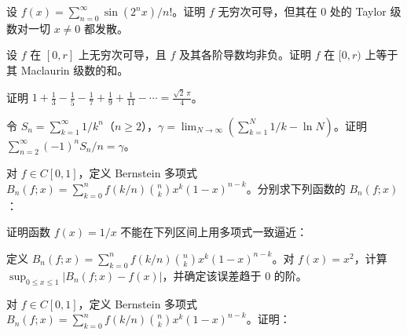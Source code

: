 \newpage
\noindent\begin{minipage}{\textwidth}
设 $f(x)=\sum_{n=0}^{\infty}\sin(2^nx)/n!$。证明 $f$ 无穷次可导，但其在 $0$ 处的 Taylor 级数对一切 $x\ne0$ 都发散。
\end{minipage}\par\vfill
\noindent\begin{minipage}{\textwidth}
设 $f$ 在 $[0,r]$ 上无穷次可导，且 $f$ 及其各阶导数均非负。证明 $f$ 在 $[0,r)$ 上等于其 Maclaurin 级数的和。
\end{minipage}\par\vfill
\noindent\begin{minipage}{\textwidth}
证明 $\displaystyle1+\frac13-\frac15-\frac17+\frac19+\frac1{11}-\cdots=\frac{\sqrt2\,\pi}4$。
\end{minipage}\par\vfill
\newpage
\noindent\begin{minipage}{\textwidth}
令 $S_n=\sum_{k=1}^{\infty}1/k^n$（$n\ge2$），$\gamma=\lim_{N\to\infty}(\sum_{k=1}^N1/k-\ln N)$。证明 $\sum_{n=2}^{\infty}(-1)^nS_n/n=\gamma$。
\end{minipage}\par\vfill
\noindent\begin{minipage}{\textwidth}
对 $f\in C[0,1]$，定义 Bernstein 多项式 $B_n(f;x)=\sum_{k=0}^nf(k/n)\binom nk x^k(1-x)^{n-k}$。分别求下列函数的 $B_n(f;x)$：
\end{minipage}\par\vfill
\noindent\begin{minipage}{\textwidth}
证明函数 $f(x)=1/x$ 不能在下列区间上用多项式一致逼近：
\SubQ{1}{$(0,1]$。}
\SubQ{2}{$[1,+\infty)$。}
\end{minipage}\par\vfill
\newpage
\noindent\begin{minipage}{\textwidth}
定义 $B_n(f;x)=\sum_{k=0}^nf(k/n)\binom nk x^k(1-x)^{n-k}$。对 $f(x)=x^2$，计算 $\sup_{0\le x\le1}|B_n(f;x)-f(x)|$，并确定该误差趋于 $0$ 的阶。
\end{minipage}\par\vfill
\noindent\begin{minipage}{\textwidth}
对 $f\in C[0,1]$，定义 Bernstein 多项式 $B_n(f;x)=\sum_{k=0}^nf(k/n)\binom nk x^k(1-x)^{n-k}$。证明：
\end{minipage}\par\vfill
